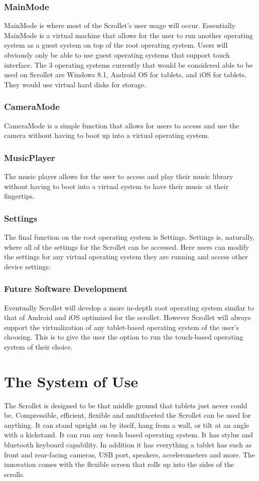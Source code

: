 \documentclass[a4paper]{article}
\begin{document}
\subsubsection{MainMode}
MainMode is where most of the Scrollet's user usage will occur. Essentially MainMode is a virtual machine that allows for the user to run another operating system as a guest system on top of the root operating system. Users will obviously only be able to use guest operating systems that support touch interface. The 3 operating systems currently that would be considered able to be used on Scrollet are Windows 8.1, Android OS for tablets, and iOS for tablets. They would use virtual hard disks for storage.

\subsubsection{CameraMode}
CameraMode is a simple function that allows for users to access and use the camera without having to boot up into a virtual operating system.

\subsubsection{MusicPlayer}
The music player allows for the user to access and play their music library without having to boot into a virtual system to have their music at their fingertips.

\subsubsection{Settings}
The final function on the root operating system is Settings. Settings is, naturally, where all of the settings for the Scrollet can be accessed. Here users can modify the settings for any virtual operating system they are running and access other device settings.

\subsubsection{Future Software Development}
Eventually Scrollet will develop a more in-depth root operating system similar to that of Android and iOS optimized for the scrollet. However Scrollet will always support the virtualization of any tablet-based operating system of the user's choosing. This is to give the user the option to run the touch-based operating system of their choice.

\section{The System of Use}
The Scrollet is designed to be that middle ground that tablets just never could be. Compressible, efficient, flexible and multifaceted the Scrollet can be used for anything. It can stand upright on by itself, hang from a wall, or tilt at an angle with a kickstand. It can run any touch based operating system. It has stylus and bluetooth keyboard capability. In addition it has everything a tablet has such as front and rear-facing cameras, USB port, speakers, accelerometers and more. The innovation comes with the flexible screen that rolls up into the sides of the scrolls.
\end{document}
